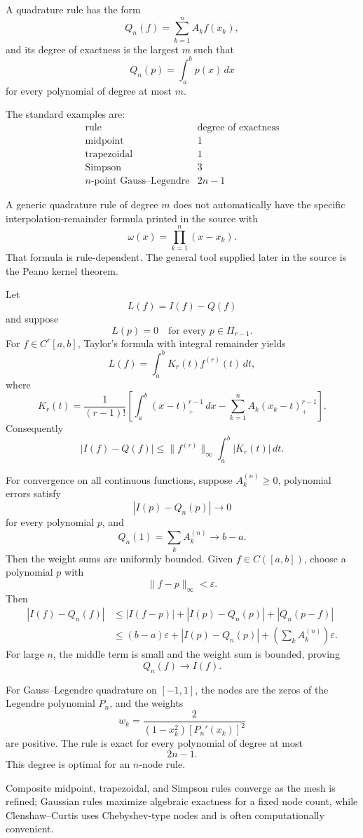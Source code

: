 \begin{solution}
A quadrature rule has the form
\[
Q_n(f)
=
\sum_{k=1}^{n}A_kf(x_k),
\]
and its degree of exactness is the largest \(m\) such that
\[
Q_n(p)=\int_a^bp(x)\,dx
\]
for every polynomial of degree at most \(m\).

The standard examples are:
\[
\boxed{
\begin{array}{c|c}
\text{rule}&\text{degree of exactness}\\ \hline
\text{midpoint}&1\\
\text{trapezoidal}&1\\
\text{Simpson}&3\\
n\text{-point Gauss--Legendre}&2n-1
\end{array}}
\]

A generic quadrature rule of degree \(m\) does not automatically have the specific
interpolation-remainder formula printed in the source with
\[
\omega(x)=\prod_{k=1}^{n}(x-x_k).
\]
That formula is rule-dependent. The general tool supplied later in the source is the Peano
kernel theorem.

Let
\[
L(f)
=
I(f)-Q(f)
\]
and suppose
\[
L(p)=0
\quad
\text{for every }p\in\Pi_{r-1}.
\]
For \(f\in C^r[a,b]\), Taylor's formula with integral remainder yields
\[
L(f)
=
\int_a^b
K_r(t)f^{(r)}(t)\,dt,
\]
where
\[
\boxed{
K_r(t)
=
\frac1{(r-1)!}
\left[
\int_a^b(x-t)_+^{r-1}\,dx
-
\sum_{k=1}^{n}
A_k(x_k-t)_+^{r-1}
\right].
}
\]
Consequently
\[
\boxed{
|I(f)-Q(f)|
\le
\|f^{(r)}\|_\infty
\int_a^b|K_r(t)|\,dt.
}
\]

For convergence on all continuous functions, suppose \(A_k^{(n)}\ge0\), polynomial errors
satisfy
\[
|I(p)-Q_n(p)|\to0
\]
for every polynomial \(p\), and
\[
Q_n(1)
=
\sum_kA_k^{(n)}
\to
b-a.
\]
Then the weight sums are uniformly bounded. Given \(f\in C([a,b])\), choose a polynomial
\(p\) with
\[
\|f-p\|_\infty<\varepsilon.
\]
Then
\[
\begin{aligned}
|I(f)-Q_n(f)|
&\le
|I(f-p)|
+
|I(p)-Q_n(p)|
+
|Q_n(p-f)|\\
&\le
(b-a)\varepsilon
+
|I(p)-Q_n(p)|
+
\left(\sum_kA_k^{(n)}\right)\varepsilon.
\end{aligned}
\]
For large \(n\), the middle term is small and the weight sum is bounded, proving
\[
\boxed{Q_n(f)\to I(f).}
\]

For Gauss--Legendre quadrature on \([-1,1]\), the nodes are the zeros of the Legendre
polynomial \(P_n\), and the weights
\[
\boxed{
w_k
=
\frac{2}{
(1-x_k^2)[P_n'(x_k)]^2
}
}
\]
are positive. The rule is exact for every polynomial of degree at most
\[
2n-1.
\]
This degree is optimal for an \(n\)-node rule.

Composite midpoint, trapezoidal, and Simpson rules converge as the mesh is refined; Gaussian
rules maximize algebraic exactness for a fixed node count, while Clenshaw--Curtis uses
Chebyshev-type nodes and is often computationally convenient.
\end{solution}


